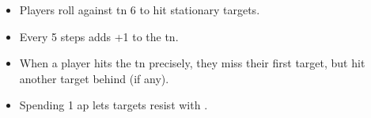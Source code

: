 \begin{itemize}
  \item
  Players roll  against \gls{tn} 6 to hit stationary targets.
  \item
  Every 5 steps adds +1 to the \gls{tn}.
  \item
  When a player hits the \gls{tn} precisely, they miss their first target, but hit another target behind (if any).
  \item
  Spending 1 \gls{ap} lets targets resist with .
\end{itemize}
